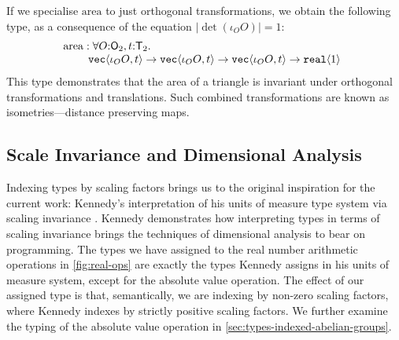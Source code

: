 \begin{example}
  If we specialise $\mathrm{area}$ to just orthogonal transformations,
  we obtain the following type, as a consequence of the equation
  $|\det (\iota_OO)| = 1$:
  \begin{displaymath}
    \begin{array}{@{}l}
      \mathrm{area} : \forall O\mathord:\SynOrth_2, t\mathord:\SynTransl_2.\ \\
      \hspace{0.8cm}\tyPrim{vec}{\iota_OO, t} \to \tyPrim{vec}{\iota_OO, t} \to \tyPrim{vec}{\iota_OO, t} \to \tyPrim{real}{1}
    \end{array}
  \end{displaymath}
  This type demonstrates that the area of a triangle is invariant
  under orthogonal transformations and translations. Such combined
  transformations are known as isometries---distance preserving maps.
\end{example}


\subsection{Scale Invariance and Dimensional Analysis}
\label{sec:scale-invariance}

Indexing types by scaling factors brings us to the original
inspiration for the current work: Kennedy's interpretation of his
units of measure type system via scaling invariance
\cite{kennedy97relational}. Kennedy demonstrates how interpreting
types in terms of scaling invariance brings the techniques of
dimensional analysis  to bear on programming. The types we
have assigned to the real number arithmetic operations in
\autoref{fig:real-ops} are exactly the types Kennedy assigns in his
units of measure system, except for the absolute value operation. The
effect of our assigned type is that, semantically, we are indexing by
non-zero scaling factors, where Kennedy indexes by strictly positive
scaling factors. We further examine the typing of the absolute value
operation in \autoref{sec:types-indexed-abelian-groups}.

